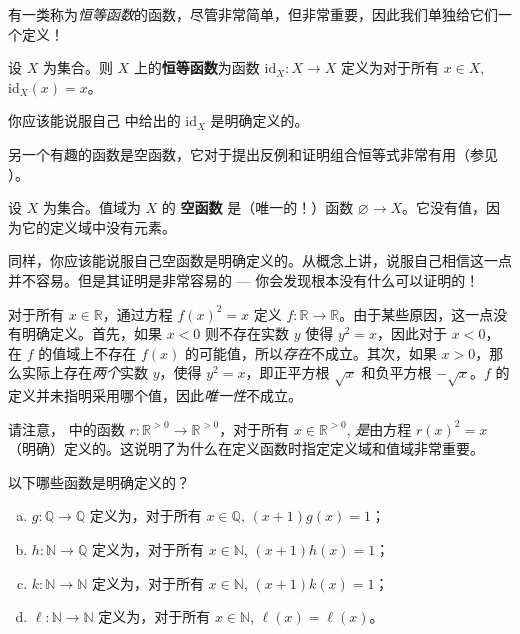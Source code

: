 有一类称为\textit{恒等函数}的函数，尽管非常简单，但非常重要，因此我们单独给它们一个定义！

\begin{definition}
\label{defIdentityFunction}
设 $X$ 为集合。则 $X$ 上的\textbf{恒等函数}为函数 $\mathrm{id}_X : X \to X$  定义为对于所有 $x \in X$, $\mathrm{id}_X(x)=x$。
\end{definition}

你应该能说服自己  中给出的 $\mathrm{id}_X$ 是明确定义的。

另一个有趣的函数是空函数，它对于提出反例和证明组合恒等式非常有用（参见 ）。

\begin{definition}
\label{defEmptyFunction}
设 $X$ 为集合。值域为 $X$ 的 \textbf{空函数} 是（唯一的！）函数 $\varnothing \to X$。它没有值，因为它的定义域中没有元素。
\end{definition}

同样，你应该能说服自己空函数是明确定义的。从概念上讲，说服自己相信这一点并不容易。但是其证明是非常容易的 --- 你会发现根本没有什么可以证明的！

\begin{example}
对于所有 $x \in \mathbb{R}$，通过方程 $f(x)^2=x$ 定义 $f : \mathbb{R} \to \mathbb{R}$。由于某些原因，这一点没有明确定义。首先，如果 $x<0$ 则不存在实数 $y$ 使得 $y^2=x$，因此对于 $x<0$，在 $f$ 的值域上不存在 $f(x)$ 的可能值，所以\textit{存在}不成立。其次，如果 $x>0 $，那么实际上存在\textit{两个}实数 $y$，使得 $y^2=x$，即正平方根 $\sqrt{x}$ 和负平方根 $-\sqrt{x}$。$f$ 的定义并未指明采用哪个值，因此\textit{唯一性}不成立。

请注意， 中的函数 $r : \mathbb{R}^{>0} \to \mathbb{R}^{>0}$，对于所有 $x \in \mathbb{R}^{>0}$, \textit{是}由方程 $r(x)^2 = x$（明确）定义的。这说明了为什么在定义函数时指定定义域和值域非常重要。
\end{example}

\begin{exercise}
以下哪些函数是明确定义的？
\begin{enumerate}[(a)]
\item $g : \mathbb{Q} \to \mathbb{Q}$ 定义为，对于所有 $x \in \mathbb{Q}$, $(x+1)g(x)=1$；
\item $h : \mathbb{N} \to \mathbb{Q}$ 定义为，对于所有 $x \in \mathbb{N}$, $(x+1)h(x)=1$；
\item $k : \mathbb{N} \to \mathbb{N}$ 定义为，对于所有 $x \in \mathbb{N}$, $(x+1)k(x)=1$；
\item $\ell : \mathbb{N} \to \mathbb{N}$ 定义为，对于所有 $x \in \mathbb{N}$, $\ell(x)=\ell(x)$。
\end{enumerate}
\end{exercise}

